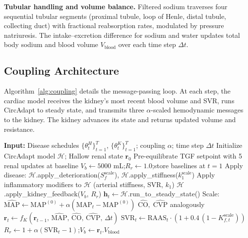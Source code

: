 \documentclass[pmlr]{jmlr}
\begin{document}
\textbf{Tubular handling and volume balance.} Filtered sodium traverses four sequential tubular segments (proximal tubule, loop of Henle, distal tubule, collecting duct) with fractional reabsorption rates, modulated by pressure natriuresis. The intake--excretion difference for sodium and water updates total body sodium and blood volume $V_{\text{blood}}$ over each time step $\Delta t$.

\subsection{Coupling Architecture}
\label{sec:coupling}

Algorithm~\ref{alg:coupling} details the message-passing loop. At each step, the cardiac model receives the kidney's most recent blood volume and SVR, runs CircAdapt to steady state, and transmits three $\alpha$-scaled hemodynamic messages to the kidney. The kidney advances its state and returns updated volume and resistance.

\begin{algorithm}[t]
\caption{Coupled Cardiorenal Simulation}\label{alg:coupling}
\begin{algorithmic}[1]
\small
\STATE \textbf{Input:} Disease schedules $\{\theta_t^H\}_{t=1}^T$, $\{\theta_t^K\}_{t=1}^T$; coupling $\alpha$; time step $\Delta t$
\STATE Initialize CircAdapt model $\mathcal{H}$; Hallow renal state $\mathbf{r}_0$
\STATE Pre-equilibrate TGF setpoint with 5 renal updates at baseline
\STATE $V_b \leftarrow 5000$ mL;\enspace $R_r \leftarrow 1.0$;\enspace store baselines at $t\!=\!1$
    \STATE Apply disease: $\mathcal{H}$.apply\_deterioration($S_f^{\text{scale}}$), $\mathcal{H}$.apply\_stiffness($k_1^{\text{scale}}$)
    \STATE Apply inflammatory modifiers to $\mathcal{H}$ (arterial stiffness, SVR, $k_1$)
    \STATE $\mathcal{H}$.apply\_kidney\_feedback($V_b$, $R_r$) \hfill{}
    \STATE $\mathbf{h}_t \leftarrow \mathcal{H}$.run\_to\_steady\_state() \hfill{}
    \STATE Scale: $\widehat{\text{MAP}} \leftarrow \text{MAP}^{(0)} + \alpha(\text{MAP}_t - \text{MAP}^{(0)})$ \hfill{}
    \STATE $\widehat{\text{CO}},\;\widehat{\text{CVP}}$ analogously
    \STATE $\mathbf{r}_t \leftarrow f_K(\mathbf{r}_{t-1},\, \widehat{\text{MAP}},\, \widehat{\text{CO}},\, \widehat{\text{CVP}},\, \Delta t)$ \hfill{}
    \STATE $\text{SVR}_t \leftarrow \text{RAAS}_t \cdot (1 + 0.4\,(1 - K_{f,t}^{\text{scale}}))$ \hfill{}
    \STATE $R_r \leftarrow 1 + \alpha(\text{SVR}_t - 1)$;\enspace $V_b \leftarrow \mathbf{r}_t.V_{\text{blood}}$
\ENDFOR
\end{algorithmic}
\end{algorithm}
\end{document}
